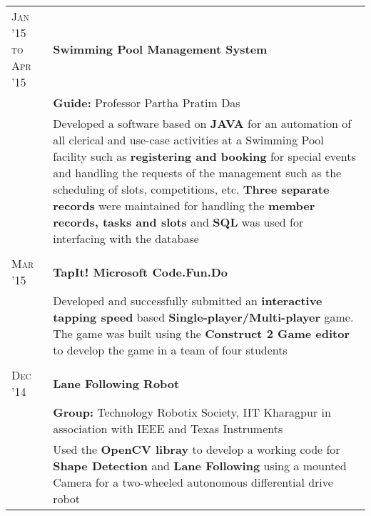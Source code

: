 \documentclass[a4paper,10pt]{extarticle} %
\begin{document}
\begin{tabular}{R{3.0cm}|p{15.0cm}}
\textsc{Jan '15 to Apr '15} & \textbf{Swimming Pool Management System}\\
& \textbf{Guide: }\textmd{Professor Partha Pratim Das}\\
& \textmd{Developed a software based on \textbf{JAVA} for an automation of all clerical and use-case activities at a Swimming Pool facility such as \textbf{registering and booking} for special events and handling the requests of the management such as the scheduling of slots, competitions, etc. \textbf{Three separate records} were maintained for handling the \textbf{member records, tasks and slots} and \textbf{SQL} was used for interfacing with the database}\\
 \\

\textsc{Mar '15} & \textbf{TapIt! Microsoft Code.Fun.Do}\\
& \footnotesize{Developed and successfully submitted an \textbf{interactive tapping speed} based \textbf{Single-player/Multi-player} game. The game was built using the \textbf{Construct 2 Game editor} to develop the game in a team of four students}\\
 \\

\textsc{Dec '14} & \textbf{Lane Following Robot} \\
& \textbf{Group: }\textmd{Technology Robotix Society}, IIT Kharagpur in association with IEEE and Texas Instruments\\
& \textmd{Used the \textbf{OpenCV libray} to develop a working code for \textbf{Shape Detection} and \textbf{Lane Following} using a mounted Camera for a two-wheeled autonomous differential drive robot}\\

\end{tabular}

\end{document}
